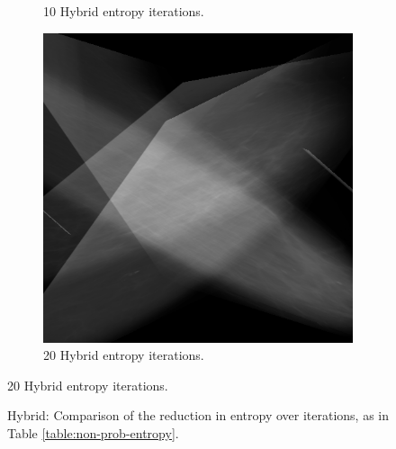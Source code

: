 \begin{figure}[H]
\begin{subfigure}[t]{0.3\textwidth}
        \caption{10 Hybrid entropy iterations.}
        \label{fig:10-hybrid}
    \end{subfigure} \hfill
    \begin{subfigure}[t]{0.3\textwidth}
      \includegraphics[width=\textwidth]{Chapter3/hybrid-img/hybrid20.png}
      \caption{20 Hybrid entropy iterations.}
      \label{fig:20-hybrid}
    \end{subfigure}
\end{figure}

\begin{figure}[H]
  \begin{center}

    \caption{Hybrid: Comparison of the reduction in entropy over iterations, as in Table \ref{table:non-prob-entropy}.}
  \end{center}
\end{figure}

